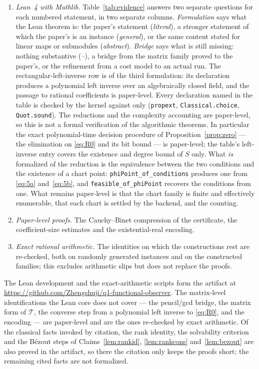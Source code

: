 \documentclass[journal]{IEEEtran}
\theoremstyle{plainn}
\theoremstyle{remark}
\begin{document}
\begin{enumerate}
\item \emph{Lean~4 with Mathlib.} Table~\ref{tab:evidence} answers two separate questions for each
numbered statement, in two separate columns. \emph{Formulation} says what the Lean theorem is: the
paper's statement (\emph{literal}), a stronger statement of which the paper's is an instance
(\emph{general}), or the same content stated for linear maps or submodules (\emph{abstract}).
\emph{Bridge} says what is still missing: nothing substantive (\emph{--}), a bridge from the matrix
family proved to the paper's, or the refinement from a cost model to an actual run. The
rectangular-left-inverse row is of the third formulation: its declaration produces a polynomial left
inverse over an algebraically closed field, and the passage to rational coefficients is paper-level.
Every declaration named in the table is checked by the
kernel against only (\texttt{propext}, \texttt{Classical.choice}, \texttt{Quot.sound}). The
reductions and the complexity accounting are paper-level, so this is not a formal
verification of the algorithmic theorems. In particular the exact polynomial-time decision
procedure of Proposition~\ref{prop:zero} --- the elimination on \eqref{eq:R0} and its bit bound ---
is paper-level; the table's left-inverse entry covers the existence and degree bound of $S$ only.
What \emph{is} formalized of the reduction is the equivalence between the two conditions and the
existence of a chart point: \texttt{phiPoint\_of\_conditions} produces one from \eqref{eq:5a}
and~\eqref{eq:5b}, and \texttt{feasible\_of\_phiPoint} recovers the conditions from one. What
remains paper-level is that the chart family is finite and effectively enumerable, that each chart
is settled by the backend, and the counting.
\item \emph{Paper-level proofs.} The Cauchy--Binet compression of the certificate, the coefficient-size estimates and the existential-real encoding.
\item \emph{Exact rational arithmetic.} The identities on which the constructions rest are re-checked, both on randomly generated instances and on the constructed families; this excludes arithmetic slips but does not replace the proofs.
\end{enumerate}

The Lean development and the exact-arithmetic scripts form the artifact at
\url{https://github.com/Zhengshuji/q1-functional-observer}. The matrix-level identifications the Lean
core does not cover --- the pencil/gcd bridge, the matrix form of $\mathcal T$, the converse step from
a polynomial left inverse to \eqref{eq:R0}, and the encoding --- are paper-level and are the ones
re-checked by exact arithmetic. Of the classical facts invoked by citation, the rank identity, the
solvability criterion and the B\'ezout steps of Claims~\ref{lem:rankid}, \ref{lem:rankcons}
and~\ref{lem:bezout} are also proved in the artifact, so there the citation only keeps the proofs
short; the remaining cited facts are not formalized.
\end{document}
